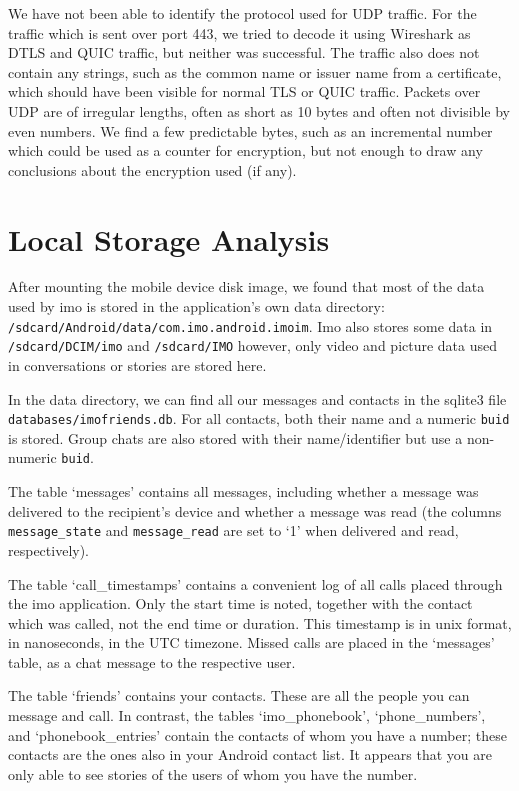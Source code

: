 \documentclass[conference]{IEEEtran}
\begin{document}
We have not been able to identify the protocol used for UDP traffic. For the
traffic which is sent over port 443, we tried to decode it using Wireshark as
DTLS and QUIC traffic, but neither was successful. The traffic also does not
contain any strings, such as the common name or issuer name from a certificate,
which should have been visible for normal TLS or QUIC traffic. Packets over UDP
are of irregular lengths, often as short as 10 bytes and often not divisible by
even numbers. We find a few predictable bytes, such as an incremental number
which could be used as a counter for encryption, but not enough to draw any
conclusions about the encryption used (if any).


\section{Local Storage Analysis}\label{sec:storage}

After mounting the mobile device disk image, we found that most of the data used
by imo is stored in the application's own data directory:
\texttt{/sdcard/Android/data/com.imo.android.imoim}. Imo also stores some data
in \texttt{/sdcard/DCIM/imo} and \texttt{/sdcard/IMO} however, only video and
picture data used in conversations or stories are stored here.

In the data directory, we can find all our messages and contacts in the sqlite3
file \texttt{databases/imofriends.db}. For all contacts, both their name and a
numeric \texttt{buid} is stored. Group chats are also stored with their
name/identifier but use a non-numeric \texttt{buid}.

The table `messages' contains all messages, including whether a message was
delivered to the recipient's device and whether a message was read (the columns
\texttt{message\_state} and \texttt{message\_read} are set to `1' when
delivered and read, respectively).

The table `call\_timestamps' contains a convenient log of all calls placed
through the imo application. Only the start time is noted, together with the
contact which was called, not the end time or duration. This timestamp is in
unix format, in nanoseconds, in the UTC timezone. Missed calls are placed in
the `messages' table, as a chat message to the respective user.

The table `friends' contains your contacts. These are all the people you can
message and call. In contrast, the tables `imo\_phonebook', `phone\_numbers',
and `phonebook\_entries' contain the contacts of whom you have a number; these
contacts are the ones also in your Android contact list. It appears that you
are only able to see stories of the users of whom you have the number.
\end{document}
